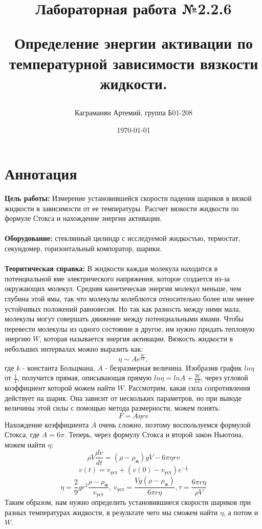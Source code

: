 \documentclass[a4paper, 12pt]{article}
\title{\begin{center}Лабораторная работа №2.2.6\end{center}
Определение энергии активации по температурной зависимости вязкости жидкости.}
\author{Каграманян Артемий, группа Б01-208}
\date{\today}
\begin{document}
\maketitle

\section{Аннотация}
\textbf{Цель работы:} Измерение установившейся скорости падения шариков в вязкой жидкости в зависимости от ее температуры. Рассчет вязкости жидкости по формуле Стокса и нахождение энергии активации.\\
\\
\textbf{Оборудование:} стеклянный цилиндр с исследуемой жидкостью, термостат, секундомер, горизонтальный компоратор, шарики.\\
\\
\textbf{Теоритическая справка:} В жидкости каждая молекула находится в потенциальной яме электрического напряжения, которое создается из-за окружающих молекул. Средняя кинетическая энергия молекул меньше, чем глубина этой ямы, так что молекулы колеблются относительно более или менее устойчивых положений равновесия. Но так как разность между ними мала, молекулы могут совершать движение между потенциальными ямами. Чтобы перевести молекулы из одного состояние в другое, им нужно придать тепловую энергию \(W\), которая называется энергия активации. Вязкость жидкости в небольших интервалах можно выразить как:
\[\eta \sim Ae^{\frac{W}{kT}},\]
где $k$ - константа Больцмана, $A$ - безразмерная величина. Изобразив график \(ln \eta\) от \(\frac{1}{T}\), получится прямая, описывающая прямую \(ln\eta = lnA + \frac{W}{kT}\), через угловой коэффициент которой можем найти \(W\). Рассмотрим, какая сила сопротивления действует на шарик. Она зависит от нескольких параметров, но при выводе величины этой силы с помощью метода размерности, можем понять:
\[F = A\eta r v\]
Нахождение коэффициента \(A\) очень сложно, поэтому воспользуемся формулой Стокса, где \(A = 6\pi\). Теперь, через формулу Стокса и второй закон Ньютона, можем найти \(\eta\):
\[\rho V \frac{dv}{dt} = (\rho - \rho_{ж})g V - 6 \pi \eta r v\]
\[v(t) = v_{уст} + (v(0) - v_{уст})e^{-\frac{t}{\tau}}\]
\[\eta = \frac{2}{9}gr^2\frac{\rho - \rho_ж}{v_{уст}}, \ v_{уст} = \frac{Vg(\rho - \rho_ж)}{6\pi r \eta}, \tau = \frac{6\pi r \eta}{\rho V}\]
Таким образом, нам нужно определить установившиеся скорости шариков при разных температурах жидкости, в результате чего мы сможем найти \(\eta\), а потом и \(W\).
\end{document}
